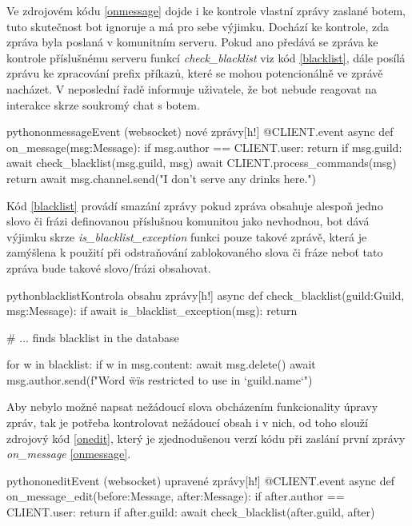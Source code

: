 \documentclass[
  program=inf,
biblatex=false,
sourcecodes=true,
joinlists=true,
  figures=true,
  tables=true,
  glossaries=true,
  index=false
]{kidiplom}
\begin{document}
Ve zdrojovém kódu \ref{onmessage}  dojde i ke kontrole vlastní zprávy zaslané botem, tuto skutečnost bot ignoruje a má pro sebe
výjimku. Dochází ke kontrole, zda zpráva byla poslaná v komunitním serveru. Pokud ano předává se zpráva ke kontrole příslušnému serveru
funkcí {\it check\_blacklist} viz kód \ref{blacklist}, dále posílá zprávu ke zpracování prefix příkazů, které se mohou potencionálně
ve zprávě nacházet. V neposlední řadě informuje uživatele, že bot nebude reagovat na interakce skrze soukromý chat s botem.

\begin{kicode}{python}{onmessage}{Event (websocket) nové zprávy}[h!]
  @CLIENT.event    
  async def on_message(msg:Message):
      if msg.author == CLIENT.user:
          return
      if msg.guild:
          await check_blacklist(msg.guild, msg)
          await CLIENT.process_commands(msg)
          return
      await msg.channel.send("I don't serve any drinks here.")
\end{kicode}

Kód \ref{blacklist} provádí smazání zprávy pokud zpráva obsahuje alespoň jedno slovo či frázi definovanou příslušnou
komunitou jako nevhodnou, bot dává výjimku skrze {\it is\_blacklist\_exception} funkci pouze takové zprávě, která je zamýšlena
k použití při odstraňování zablokovaného slova či fráze neboť tato zpráva bude takové slovo/frázi obsahovat.

\begin{kicode}{python}{blacklist}{Kontrola obsahu zprávy}[h!]
  async def check_blacklist(guild:Guild, msg:Message):
    if await is_blacklist_exception(msg):
        return
    
    # ... finds blacklist in the database
    
    for w in blacklist:
        if w in msg.content:
            await msg.delete()
            await msg.author.send(f"Word \"{w}\" is restricted to use in `{guild.name}`")
\end{kicode}

Aby nebylo možné napsat nežádoucí slova  obcházením funkcionality úpravy zpráv, tak je potřeba kontrolovat 
nežádoucí obsah i v nich, od toho slouží zdrojový kód \ref{onedit}, který je zjednodušenou verzí kódu při zaslání první zprávy
{\it on\_message} \ref{onmessage}. 

\begin{kicode}{python}{onedit}{Event (websocket) upravené zprávy}[h!]
  @CLIENT.event
  async def on_message_edit(before:Message, after:Message):
      if after.author == CLIENT.user:
          return
      if after.guild:
          await check_blacklist(after.guild, after)
\end{kicode}
\end{document}
